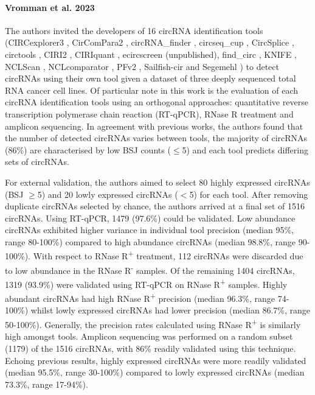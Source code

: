 \documentclass[pdflatex,sn-mathphys-num]{sn-jnl}
\begin{document}
\paragraph*{Vromman et al. 2023}
The authors invited the developers of 16 circRNA identification tools (CIRCexplorer3 \cite{CIRCexplorer3}, CirComPara2 \cite{CirComPara2}, circRNA\_finder \cite{circRNA_finder}, circseq\_cup \cite{circseq_cup}, CircSplice \cite{CircSplice}, circtools \cite{circtools}, CIRI2 \cite{CIRI2}, CIRIquant \cite{CIRIquant}, ecircscreen (unpublished), find\_circ \cite{find_circ}, KNIFE \cite{KNIFE}, NCLScan \cite{NCLscan}, NCLcomparator \cite{NCLcomparator}, PFv2 \cite{PFv2}, Sailfish-cir \cite{Sailfishcir} and Segemehl \cite{segemehl}) to detect circRNAs using their own tool given a dataset of three deeply sequenced total RNA cancer cell lines. Of particular note in this work is the evaluation of each circRNA identification tools using an orthogonal approaches: quantitative reverse transcription polymerase chain reaction (RT-qPCR), RNase R treatment and amplicon sequencing. In agreement with previous works, the authors found that the number of detected circRNAs varies between tools, the majority of circRNAs (86\%) are characterised by low BSJ counts ($\leq$5) and each tool predicts differing sets of circRNAs. \par

For external validation, the authors aimed to select 80 highly expressed circRNAs (BSJ $\geq$5) and 20 lowly expressed circRNAs ($<$5) for each tool. After removing duplicate circRNAs selected by chance, the authors arrived at a final set of 1516 circRNAs. Using RT-qPCR, 1479 (97.6\%) could be validated. Low abundance circRNAs exhibited higher variance in individual tool precision (median 95\%, range 80-100\%) compared to high abundance circRNAs (median 98.8\%, range 90-100\%). With respect to RNase R\textsuperscript{+} treatment, 112 circRNAs were discarded due to low abundance in the RNase R\textsuperscript{-} samples. Of the remaining 1404 circRNAs, 1319 (93.9\%) were validated using RT-qPCR on RNase R\textsuperscript{+} samples. Highly abundant circRNAs had high RNase R\textsuperscript{+} precision (median 96.3\%, range 74-100\%) whilst lowly expressed circRNAs had lower precision (median 86.7\%, range 50-100\%). Generally, the precision rates calculated using RNase R\textsuperscript{+} is similarly high amongst tools. Amplicon sequencing was performed on a random subset (1179) of the 1516 circRNAs, with 86\% readily validated using this technique. Echoing previous results, highly expressed circRNAs were more readily validated (median 95.5\%, range 30-100\%) compared to lowly expressed circRNAs (median 73.3\%, range 17-94\%). \par
\end{document}
